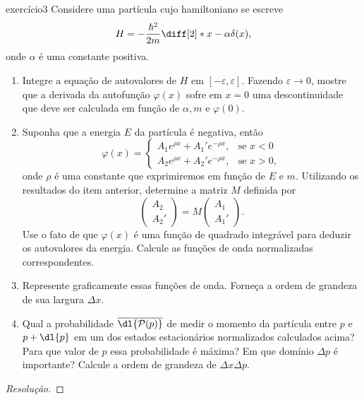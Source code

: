 \begin{exercício}{}{exercício3}
    Considere uma partícula cujo hamiltoniano se escreve
    \begin{equation*}
        H = - \frac{\hbar^2}{2m} \diff[2]*{}{x} - \alpha \delta(x),
    \end{equation*}
    onde \(\alpha\) é uma constante positiva.
    \begin{enumerate}[label=(\alph*)]
        \item Integre a equação de autovalores de \(H\) em \([-\varepsilon, \varepsilon]\). Fazendo \(\varepsilon \to 0\), mostre que a derivada da autofunção \(\varphi(x)\) sofre em \(x = 0\) uma descontinuidade que deve ser calculada em função de \(\alpha, m\) e \(\varphi(0)\).
        \item Suponha que a energia \(E\) da partícula é negativa, então
            \begin{equation*}
                \varphi(x) = \begin{cases}
                    A_1 e^{\rho x} + A_1' e^{-\rho x},&\text{se }x < 0\\
                    A_2 e^{\rho x} + A_2' e^{-\rho x},&\text{se }x > 0,
                \end{cases}
            \end{equation*}
            onde \(\rho\) é uma constante que exprimiremos em função de \(E\) e \(m\). Utilizando os resultados do item anterior, determine a matriz \(M\) definida por
            \begin{equation*}
                \begin{pmatrix}
                    A_2\\
                    A_2'
                \end{pmatrix}=
                M
                \begin{pmatrix}
                    A_1\\
                    A_1'
                \end{pmatrix}.
            \end{equation*}
            Use o fato de que \(\varphi(x)\) é uma função de quadrado integrável para deduzir os autovalores da energia. Calcule as funções de onda normalizadas correspondentes.

        \item Represente graficamente essas funções de onda. Forneça a ordem de grandeza de sua largura \(\Delta x\).
        \item Qual a probabilidade \(\overline{\dl{\mathcal{P}(p)}}\) de medir o momento da partícula entre \(p\) e \(p + \dl{p}\) em um dos estados estacionários normalizados calculados acima? Para que valor de \(p\) essa probabilidade é máxima? Em que domínio \(\Delta p\) é importante? Calcule a ordem de grandeza de \(\Delta x \Delta p\).
    \end{enumerate}
\end{exercício}
\begin{proof}[Resolução]

\end{proof}
